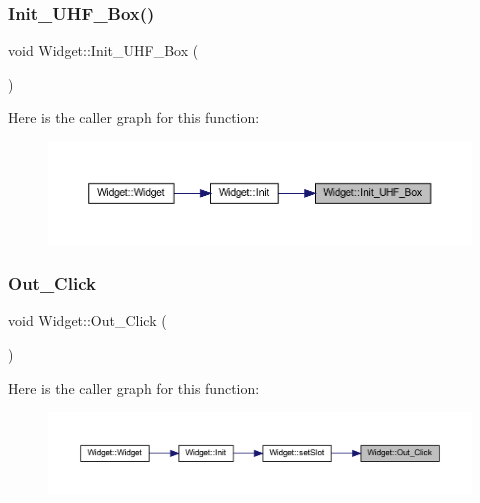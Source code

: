 \subsubsection{\texorpdfstring{Init\_UHF\_Box()}{Init\_UHF\_Box()}}
{\footnotesize\ttfamily void Widget\+::\+Init\+\_\+\+U\+H\+F\+\_\+\+Box (\begin{DoxyParamCaption}{ }\end{DoxyParamCaption})}

Here is the caller graph for this function\+:
\nopagebreak
\begin{figure}[H]
\begin{center}
\leavevmode
\includegraphics[width=350pt]{class_widget_a0565863c4d5f710fa6b503767027959b_icgraph}
\end{center}
\end{figure}
\mbox{\label{class_widget_a5ba1dc5f780dea723837e22b819a769e}} 
\subsubsection{\texorpdfstring{Out\_Click}{Out\_Click}}
{\footnotesize\ttfamily void Widget\+::\+Out\+\_\+\+Click (\begin{DoxyParamCaption}{ }\end{DoxyParamCaption})\hspace{0.3cm}{\ttfamily [slot]}}

Here is the caller graph for this function\+:
\nopagebreak
\begin{figure}[H]
\begin{center}
\leavevmode
\includegraphics[width=350pt]{class_widget_a5ba1dc5f780dea723837e22b819a769e_icgraph}
\end{center}
\end{figure}
\mbox{\label{class_widget_a28a22d7c79dd5af8dbe573ace468d61e}} 
